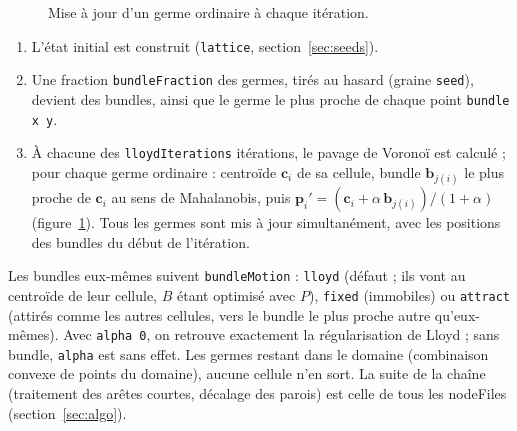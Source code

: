 \documentclass[11pt,a4paper]{article}
\newcommand{\code}[1]{\texttt{#1}}
\begin{document}
\begin{figure}[H]
  \centering
  \caption{Mise à jour d'un germe ordinaire à chaque itération.}
  \label{fig:update}
\end{figure}

\begin{enumerate}[nosep]
  \item L'état initial est construit (\code{lattice}, section~\ref{sec:seeds}).
  \item Une fraction \code{bundleFraction} des germes, tirés au hasard (graine \code{seed}), devient des bundles,
    ainsi que le germe le plus proche de chaque point \code{bundle x y}.
  \item À chacune des \code{lloydIterations} itérations, le pavage de Voronoï est calculé ; pour chaque germe
    ordinaire : centroïde $\mathbf c_i$ de sa cellule, bundle $\mathbf b_{j(i)}$ le plus proche de
    $\mathbf c_i$ au sens de Mahalanobis, puis $\mathbf p_i'=(\mathbf c_i+\alpha\,\mathbf b_{j(i)})/(1+\alpha)$
    (figure~\ref{fig:update}). Tous les germes sont mis à jour simultanément, avec les positions des bundles du
    début de l'itération.
\end{enumerate}
Les bundles eux-mêmes suivent \code{bundleMotion} : \code{lloyd} (défaut ; ils vont au centroïde de leur cellule,
$B$ étant optimisé avec $P$), \code{fixed} (immobiles) ou \code{attract} (attirés comme les autres cellules, vers le
bundle le plus proche autre qu'eux-mêmes). Avec \code{alpha 0}, on retrouve exactement la régularisation de Lloyd ;
sans bundle, \code{alpha} est sans effet. Les germes restant dans le domaine (combinaison convexe de points du
domaine), aucune cellule n'en sort. La suite de la chaîne (traitement des arêtes courtes, décalage des parois) est
celle de tous les nodeFiles (section~\ref{sec:algo}).
\end{document}
